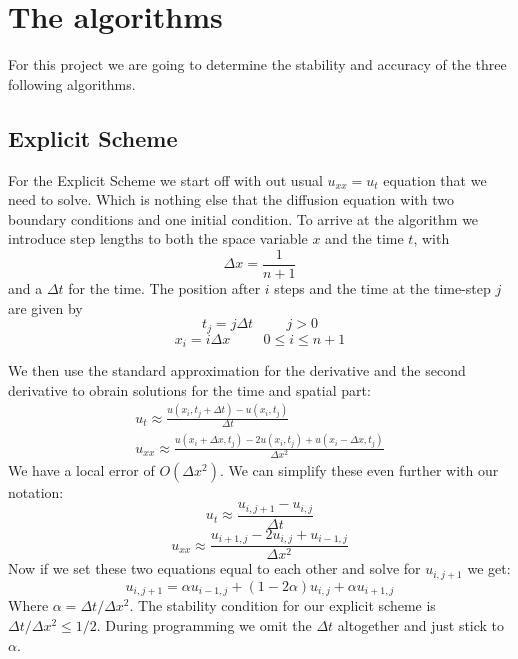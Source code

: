 \documentclass{article}
\begin{document}
\section{The algorithms}
For this project we are going to determine the stability and accuracy of the three following algorithms.
\subsection{Explicit Scheme}
For the Explicit Scheme we start off with out usual $u_{xx} = u_t$ equation that we need to solve. 
Which is nothing else that the diffusion equation with two boundary conditions and one initial condition.
To arrive at the algorithm we introduce step lengths to both the space variable $x$ and the time $t$, with $$\Delta x=\frac{1}{n+1}$$
and a $\Delta t$ for the time. The position after $i$ steps and the time at the time-step $j$ are given by
$$t_j = j\Delta t \hspace{1cm} j>0$$
$$x_i = i\Delta x\hspace{1cm} 0\le i\le n+1$$

We then use the standard approximation for the derivative and the second derivative to obrain solutions for the time and spatial part:
\begin{align*}
u_t \approx \frac{u(x_i, t_j + \Delta t) - u(x_i, t_j)}{\Delta t}\\
u_{xx} \approx \frac{u(x_i + \Delta x, t_j) - 2u(x_i, t_j) + u(x_i - \Delta x, t_j)}{\Delta x^2}
\end{align*} 
We have a local error of $O(\Delta x^2)$. We can simplify these even further with our notation:
$$u_t \approx \frac{u_{i,j+1} - u_{i,j}}{\Delta t}$$
$$u_{xx} \approx \frac{u_{i+1,j} - 2u_{i,j} + u_{i-1,j}}{\Delta x^2}$$
Now if we set these two equations equal to each other and solve for $u_{i,j+1}$ we get:
$$u_{i,j+1} = \alpha u_{i-1,j} + (1 -2\alpha)u_{i,j} + \alpha u_{i+1,j}$$
Where $\alpha = \Delta t/\Delta x^2$.
The stability condition for our explicit scheme is $\Delta t/\Delta x^2 \le 1/2$. During programming we omit the $\Delta t$ altogether and just stick to $\alpha$.
\end{document}
